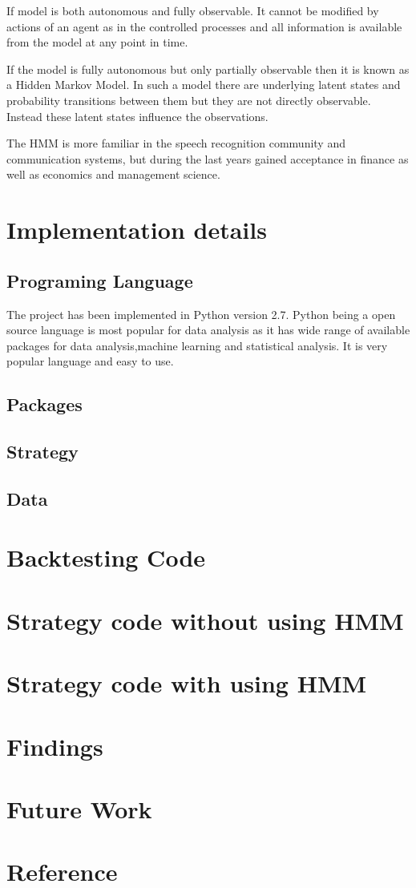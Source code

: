 \documentclass{report}
\begin{document}
If model is both autonomous and fully observable. It cannot be modified by actions of an agent as in the controlled processes and all information is available from the model at any point in time.

If the model is fully autonomous but only partially observable then it is known as a Hidden Markov Model. In such a model there are underlying latent states and probability transitions between them but they are not directly observable. Instead these latent states influence the observations. 

The HMM is more familiar in the speech recognition community and communication systems, but during the last years gained acceptance in finance as well as economics and management science.


\chapter{Implementation details}
\section{Programing Language}
The project has been implemented in Python version 2.7. Python being a open source language is most popular for data analysis as it has wide range of available packages for data analysis,machine learning and statistical analysis. It is very popular language and easy to use. 
\section{Packages}
\section{Strategy}
\section{Data}

\chapter{Backtesting Code}
\chapter{Strategy code without using HMM}
\chapter{Strategy code with using HMM}
\chapter{Findings}
\chapter{Future Work}
\chapter{Reference}
\end{document}
